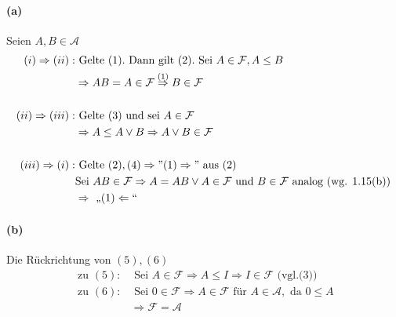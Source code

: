 \documentclass[10pt, a4paper]{article}
\begin{document}
\paragraph*{(a)} Seien $A,B\in\mathcal{A}$
\begin{align*}
	(i)\Rightarrow(ii):& \text{ Gelte } (1). \text{ Dann gilt } (2). \text{ Sei } A\in\mathcal{F}, A\leq B	\\
	&\Rightarrow  AB=A\in\mathcal{F}\stackrel{(1)}{\Rightarrow}B\in\mathcal{F}	\\
	\\
	(ii)\Rightarrow(iii):& \text{ Gelte } (3) \text{ und sei } A\in\mathcal{F}	\\
	&\Rightarrow A\leq A\vee B\Rightarrow A\vee B\in\mathcal{F}	\\
	\\
	(iii)\Rightarrow(i):& \text{ Gelte } (2),(4)\Rightarrow "(1)\Rightarrow" \text{ aus } (2)	\\
	& \text{Sei }  AB\in\mathcal{F}\Rightarrow A=AB\vee A\in\mathcal{F} \text{ und }B\in\mathcal{F}\text{ analog (wg. 1.15(b))}	\\
	&\Rightarrow\text{ „}(1)\Leftarrow\text{“ }
\end{align*}

\paragraph*{(b)} Die Rückrichtung von $(5),(6)$ \checkmark
\begin{align*}
	\text{ zu } (5):& \text{ Sei } A\in\mathcal{F}\Rightarrow A\leq I\Rightarrow I\in\mathcal{F}\text{ (vgl.(3)) }	\\
	\text{ zu } (6):& \text{ Sei } 0\in\mathcal{F}\Rightarrow A\in\mathcal{F} \text{ für } A\in\mathcal{A},	\text{ da } 0\leq A	\\
	&\Rightarrow\mathcal{F}=\mathcal{A}
\end{align*}
\end{document}
